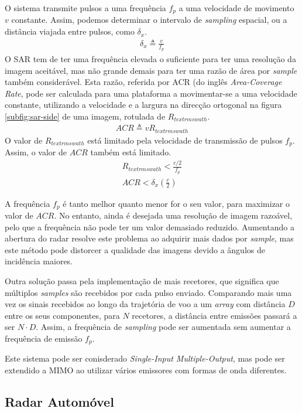 \documentclass[purist,portuguese]{ist-report}
\begin{document}
O sistema transmite pulsos a uma frequência $f_p$ a uma velocidade de movimento $v$ constante. Assim, podemos determinar o intervalo de \textit{sampling} espacial, ou a distância viajada entre pulsos, como $\delta_x$.
\begin{gather*}
	\delta_x \triangleq \frac{v}{f_p}
\end{gather*}
O SAR tem de ter uma frequência elevada o suficiente para ter uma resolução da imagem aceitável, mas não grande demais para ter uma razão de área por \textit{sample} também considerável. Esta razão, referida por ACR (do inglês \textit{Area-Coverage Rate}, pode ser calculada para uma plataforma a movimentar-se a uma velocidade constante, utilizando a velocidade e a largura na direcção ortogonal  na figura \ref{subfig:sar-side} de uma imagem, rotulada de $R_{textrm{swath}}$.
\begin{gather*}
	ACR \triangleq vR_{textrm{swath}}
\end{gather*}
O valor de $R_{textrm{swath}}$ está limitado pela velocidade de transmissão de pulsos $f_p$. Assim, o valor de $ACR$ também está limitado.
\begin{gather*}
	R_{textrm{swath}} < \frac{c/2}{f_p} \\
	ACR < \delta_x\left(\frac{c}{2}\right)
\end{gather*}

A frequência $f_p$ é tanto melhor quanto menor for o seu valor, para maximizar o valor de $ACR$. No entanto, ainda é desejada uma resolução de imagem razoável, pelo que a frequência não pode ter um valor demasiado reduzido. Aumentando a abertura do radar resolve este problema ao adquirir mais dados por \textit{sample}, mas este método pode distorcer a qualidade das imagens devido a ângulos de incidência maiores.

Outra solução passa pela implementação de mais recetores, que significa que múltiplos \textit{samples} são recebidos por cada pulso enviado. Comparando mais uma vez os sinais recebidos ao longo da trajetória de voo a um \textit{array} com distância $D$ entre os seus componentes, para $N$ recetores, a distância entre emissões passará a ser $N \cdot D$. Assim, a frequência de \textit{sampling} pode ser aumentada sem aumentar a frequência de emissão $f_p$.

Este sistema pode ser conisderado \textit{Single-Input Multiple-Output}, mas pode ser extendido a MIMO ao utilizar vários emissores com formas de onda diferentes.

\subsection{Radar Automóvel}
\end{document}
